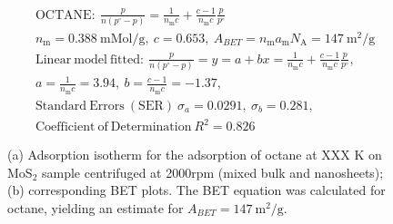 

\begin{align*}
&\mathrm{OCTANE:}\ \frac{p}{n(p^\circ-p)}=\frac{1}{n_\mathrm{m}c}+\frac{c-1}{n_\mathrm{m}c}\frac{p}{p^\circ}\\
&{n_\mathrm{m}}=0.388\ \mathrm{mMol/g},\ c=0.653,\ A_{BET}={n_\mathrm{m}}{a_\mathrm{m}}{N_\mathrm{A}}=147\ \mathrm{m}^2\mathrm{/g}\\
&\mathrm{Linear\ model\ fitted:}\ \frac{p}{n(p^\circ-p)}=y=a+bx=\frac{1}{n_\mathrm{m}c}+\frac{c-1}{n_\mathrm{m}c}\frac{p}{p^\circ},\\
&a=\frac{1}{n_\mathrm{m}c}=3.94,\ b=\frac{c-1}{n_\mathrm{m}c}=-1.37,\\
&\mathrm{Standard\ Errors\ (SER)}\ \sigma_a=0.0291,\ \sigma_b=0.281,\\
&\mathrm{Coefficient\ of\ Determination}\ R^2 = 0.826
\end{align*}


\begin{figure}[htb]
\hfill
{}
\caption{(a) Adsorption isotherm for the adsorption of octane at XXX K on MoS$_2$ 
sample centrifuged at 2000rpm (mixed bulk and nanosheets);
(b) corresponding BET plots. The BET equation was calculated for octane, yielding an estimate for $A_{BET}=147\ \mathrm{m}^2\mathrm{/g}$.}

\label{fig:sa-Reference-As-Supplied-5mg-3mm-30C-S1-SA-10ml}
\end{figure}


